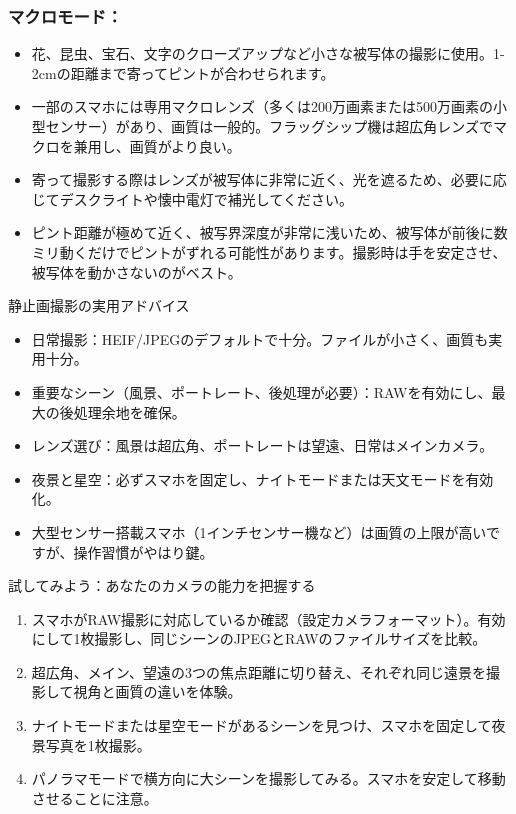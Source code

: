 \subsubsection*{マクロモード：}

\begin{itemize}
  \item 花、昆虫、宝石、文字のクローズアップなど小さな被写体の撮影に使用。1-2cmの距離まで寄ってピントが合わせられます。
  \item 一部のスマホには専用マクロレンズ（多くは200万画素または500万画素の小型センサー）があり、画質は一般的。フラッグシップ機は超広角レンズでマクロを兼用し、画質がより良い。
  \item 寄って撮影する際はレンズが被写体に非常に近く、光を遮るため、必要に応じてデスクライトや懐中電灯で補光してください。
  \item ピント距離が極めて近く、被写界深度が非常に浅いため、被写体が前後に数ミリ動くだけでピントがずれる可能性があります。撮影時は手を安定させ、被写体を動かさないのがベスト。
\end{itemize}

\begin{tcbinfo}{静止画撮影の実用アドバイス}
\begin{itemize}
  \item 日常撮影：HEIF/JPEGのデフォルトで十分。ファイルが小さく、画質も実用十分。
  \item 重要なシーン（風景、ポートレート、後処理が必要）：RAWを有効にし、最大の後処理余地を確保。
  \item レンズ選び：風景は超広角、ポートレートは望遠、日常はメインカメラ。
  \item 夜景と星空：必ずスマホを固定し、ナイトモードまたは天文モードを有効化。
  \item 大型センサー搭載スマホ（1インチセンサー機など）は画質の上限が高いですが、操作習慣がやはり鍵。
\end{itemize}

\end{tcbinfo}

\begin{tcbpractice}{試してみよう：あなたのカメラの能力を把握する}
\begin{enumerate}
  \item スマホがRAW撮影に対応しているか確認（設定カメラフォーマット）。有効にして1枚撮影し、同じシーンのJPEGとRAWのファイルサイズを比較。
  \item 超広角、メイン、望遠の3つの焦点距離に切り替え、それぞれ同じ遠景を撮影して視角と画質の違いを体験。
  \item ナイトモードまたは星空モードがあるシーンを見つけ、スマホを固定して夜景写真を1枚撮影。
  \item パノラマモードで横方向に大シーンを撮影してみる。スマホを安定して移動させることに注意。
\end{enumerate}

\end{tcbpractice}
